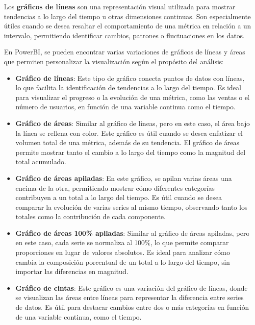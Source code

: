 \documentclass[12pt, a4paper, twoside]{article}
\begin{document}
	Los \textbf{gráficos de líneas} son una representación visual utilizada para mostrar tendencias a lo largo del tiempo u otras dimensiones continuas. Son especialmente útiles cuando se desea resaltar el comportamiento de una métrica en relación a un intervalo, permitiendo identificar cambios, patrones o fluctuaciones en los datos.
	
	En PowerBI, se pueden encontrar varias variaciones de gráficos de líneas y áreas que permiten personalizar la visualización según el propósito del análisis:
	
	\begin{itemize}
		\item \textbf{Gráfico de líneas}: Este tipo de gráfico conecta puntos de datos con líneas, lo que facilita la identificación de tendencias a lo largo del tiempo. Es ideal para visualizar el progreso o la evolución de una métrica, como las ventas o el número de usuarios, en función de una variable continua como el tiempo.
		
		\item \textbf{Gráfico de áreas}: Similar al gráfico de líneas, pero en este caso, el área bajo la línea se rellena con color. Este gráfico es útil cuando se desea enfatizar el volumen total de una métrica, además de su tendencia. El gráfico de áreas permite mostrar tanto el cambio a lo largo del tiempo como la magnitud del total acumulado.
		
		\item \textbf{Gráfico de áreas apiladas}: En este gráfico, se apilan varias áreas una encima de la otra, permitiendo mostrar cómo diferentes categorías contribuyen a un total a lo largo del tiempo. Es útil cuando se desea comparar la evolución de varias series al mismo tiempo, observando tanto los totales como la contribución de cada componente.
		
		\item \textbf{Gráfico de áreas 100\% apiladas}: Similar al gráfico de áreas apiladas, pero en este caso, cada serie se normaliza al 100\%, lo que permite comparar proporciones en lugar de valores absolutos. Es ideal para analizar cómo cambia la composición porcentual de un total a lo largo del tiempo, sin importar las diferencias en magnitud.
		
		\item \textbf{Gráfico de cintas}: Este gráfico es una variación del gráfico de líneas, donde se visualizan las áreas entre líneas para representar la diferencia entre series de datos. Es útil para destacar cambios entre dos o más categorías en función de una variable continua, como el tiempo. 
	\end{itemize}
	
\end{document}
